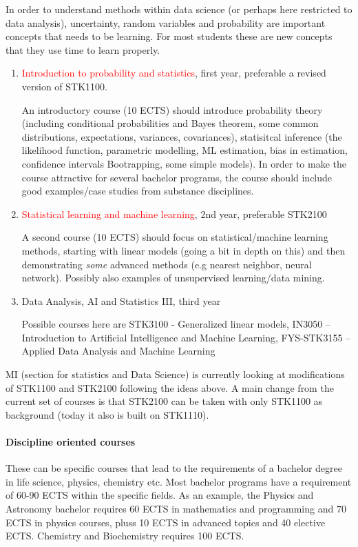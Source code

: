 \documentclass[oneside,final,10pt]{article}
\begin{document}
 In order to understand methods within data science (or perhaps here restricted to data analysis), uncertainty, random variables and probability are important concepts that needs to be learning. For most students these are new concepts that they use time to learn properly. 
\begin{enumerate}
    \item \textcolor{red}{Introduction to probability and statistics}, first year, preferable a revised version of STK1100.
    
    An introductory course (10 ECTS) should introduce probability theory (including conditional probabilities and Bayes theorem, some common distributions, expectations, variances, covariances), statisitcal inference (the likelihood function, parametric modelling, ML estimation, bias in estimation, confidence intervals Bootrapping, some simple models). In order to make the course attractive for several bachelor programs, the course should include good examples/case studies from substance disciplines.
    \item \textcolor{red}{Statistical learning and machine learning}, 2nd year, preferable STK2100
    
    A second course (10 ECTS) should focus on statistical/machine learning methods, starting with linear models (going a bit in depth on this) and then demonstrating \emph{some} advanced methods (e.g nearest neighbor, neural network). Possibly also examples of unsupervised learning/data mining.

    \item Data Analysis, AI and Statistics III, third year
    
    Possible courses here are STK3100 - Generalized linear models,  
IN3050 – Introduction to Artificial Intelligence and Machine Learning, FYS-STK3155 – Applied Data Analysis and Machine Learning 
\end{enumerate}




MI (section for statistics and Data Science) is currently looking at modifications of STK1100 and STK2100 following the ideas above. A main change from the current set of courses is that STK2100 can be taken with only STK1100 as background (today it also is built on STK1110).

\paragraph{Discipline oriented courses}

These can be specific courses that lead to the requirements of a bachelor degree in life science, physics, chemistry etc. Most bachelor programs have a requirement of 60-90 ECTS within the specific fields. As an example, the Physics and Astronomy bachelor requires 60 ECTS in mathematics and programming and 70 ECTS in physics courses, pluss 10 ECTS in advanced topics and 40 elective ECTS.  
Chemistry and Biochemistry requires 100 ECTS. 
\end{document}
